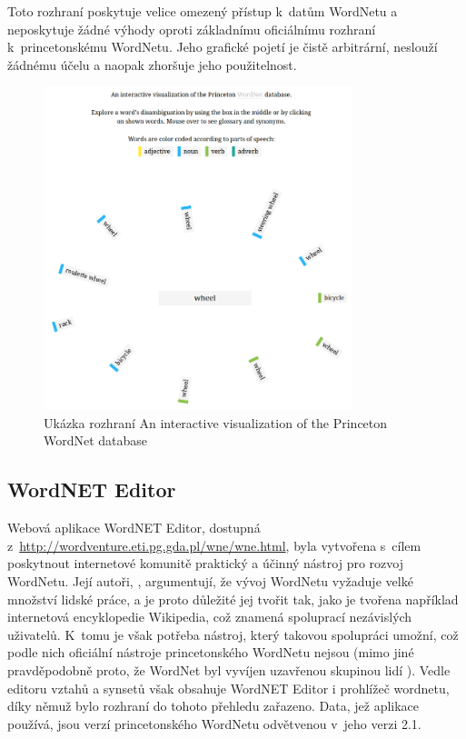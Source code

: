\documentclass[a4paper,11pt,openany,twoside]{book}
\begin{document}
					Toto rozhraní poskytuje velice omezený přístup k~datům WordNetu a neposkytuje žádné výhody oproti základnímu oficiálnímu rozhraní k~princetonskému WordNetu. Jeho grafické pojetí je čistě arbitrární, neslouží žádnému účelu a naopak zhoršuje jeho použitelnost.

					\begin{figure}[h]
						\centering
						\includegraphics[width=0.8\textwidth]{intviswn.png}
						\caption{Ukázka rozhraní An interactive visualization of the Princeton WordNet database}
						\label{fig:intviswn}
					\end{figure}

				\subsection{WordNET Editor}
				\label{wnvis:wncoledit}

					Webová aplikace WordNET Editor, dostupná z~\url{http://wordventure.eti.pg.gda.pl/wne/wne.html}, byla vytvořena s~cílem poskytnout internetové komunitě praktický a účinný nástroj pro rozvoj WordNetu. Její autoři, \textcite{szymanski2007cooperative}, argumentují, že vývoj WordNetu vyžaduje velké množství lidské práce, a je proto důležité jej tvořit tak, jako je tvořena například internetová encyklopedie Wikipedia, což znamená spoluprací nezávislých uživatelů. K~tomu je však potřeba nástroj, který takovou spolupráci umožní, což podle nich oficiální nástroje princetonského WordNetu nejsou (mimo jiné pravděpodobně proto, že WordNet byl vyvíjen uzavřenou skupinou lidí \parencite{fellbaum2005wordnets}). Vedle editoru vztahů a synsetů však obsahuje WordNET Editor i prohlížeč wordnetu, díky němuž bylo rozhraní do tohoto přehledu zařazeno. Data, jež aplikace používá, jsou verzí princetonského WordNetu odvětvenou v~jeho verzi 2.1. \parencite{szymanski2007cooperative}
\end{document}
